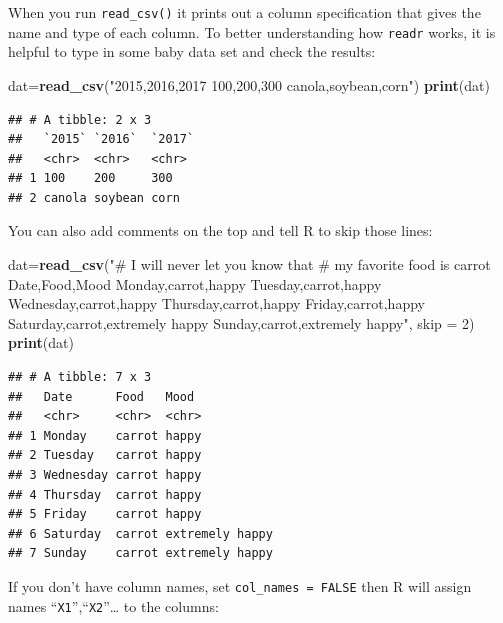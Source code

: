\documentclass[12pt,]{krantz}
\newenvironment{Shaded}{\begin{snugshade}}{\end{snugshade}}
\newcommand{\KeywordTok}[1]{\textcolor[rgb]{0.13,0.29,0.53}{\textbf{#1}}}
\newcommand{\DataTypeTok}[1]{\textcolor[rgb]{0.13,0.29,0.53}{#1}}
\newcommand{\DecValTok}[1]{\textcolor[rgb]{0.00,0.00,0.81}{#1}}
\newcommand{\StringTok}[1]{\textcolor[rgb]{0.31,0.60,0.02}{#1}}
\newcommand{\NormalTok}[1]{#1}
\theoremstyle{definition}
\theoremstyle{definition}
\theoremstyle{definition}
\theoremstyle{remark}
\begin{document}
When you run \texttt{read\_csv()} it prints out a column specification
that gives the name and type of each column. To better understanding how
\texttt{readr} works, it is helpful to type in some baby data set and
check the results:

\begin{Shaded}
\begin{Highlighting}[]
\NormalTok{dat=}\KeywordTok{read_csv}\NormalTok{(}\StringTok{"2015,2016,2017}
\StringTok{100,200,300}
\StringTok{canola,soybean,corn"}\NormalTok{)}
\KeywordTok{print}\NormalTok{(dat)}
\end{Highlighting}
\end{Shaded}

\begin{verbatim}
## # A tibble: 2 x 3
##   `2015` `2016`  `2017`
##   <chr>  <chr>   <chr> 
## 1 100    200     300   
## 2 canola soybean corn
\end{verbatim}

You can also add comments on the top and tell R to skip those lines:

\begin{Shaded}
\begin{Highlighting}[]
\NormalTok{dat=}\KeywordTok{read_csv}\NormalTok{(}\StringTok{"# I will never let you know that}
\StringTok{          # my favorite food is carrot}
\StringTok{          Date,Food,Mood}
\StringTok{          Monday,carrot,happy}
\StringTok{          Tuesday,carrot,happy}
\StringTok{          Wednesday,carrot,happy}
\StringTok{          Thursday,carrot,happy}
\StringTok{          Friday,carrot,happy}
\StringTok{          Saturday,carrot,extremely happy}
\StringTok{          Sunday,carrot,extremely happy"}\NormalTok{, }\DataTypeTok{skip =} \DecValTok{2}\NormalTok{)}
\KeywordTok{print}\NormalTok{(dat)}
\end{Highlighting}
\end{Shaded}

\begin{verbatim}
## # A tibble: 7 x 3
##   Date      Food   Mood           
##   <chr>     <chr>  <chr>          
## 1 Monday    carrot happy          
## 2 Tuesday   carrot happy          
## 3 Wednesday carrot happy          
## 4 Thursday  carrot happy          
## 5 Friday    carrot happy          
## 6 Saturday  carrot extremely happy
## 7 Sunday    carrot extremely happy
\end{verbatim}

If you don't have column names, set \texttt{col\_names\ =\ FALSE} then R
will assign names ``\texttt{X1}'',``\texttt{X2}''\ldots{} to the
columns:
\end{document}
